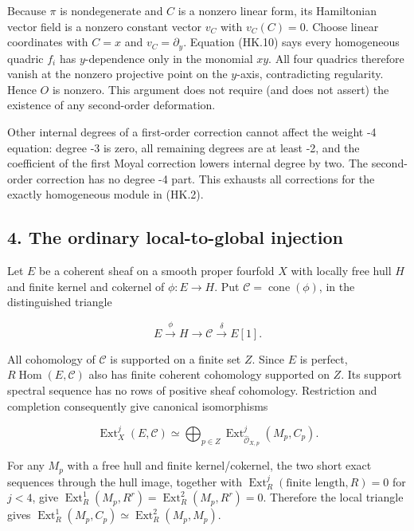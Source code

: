 Because \(\pi\) is nondegenerate and \(C\) is a nonzero linear form, its
Hamiltonian vector field is a nonzero constant vector \(v_C\) with
\(v_C(C)=0\). Choose linear coordinates with \(C=x\) and \(v_C=\partial_y\).
Equation (HK.10) says every homogeneous quadric \(f_i\) has \(y\)-dependence
only in the monomial \(xy\). All four quadrics therefore vanish at the
nonzero projective point on the \(y\)-axis, contradicting regularity.
Hence \(O\) is nonzero. This argument does not require (and does not
assert) the existence of any second-order deformation.

Other internal degrees of a first-order correction cannot affect
the weight -4 equation: degree -3 is zero, all remaining degrees
are at least -2, and the coefficient of the first Moyal correction
lowers internal degree by two. The second-order correction has no
degree -4 part. This exhausts all corrections for the exactly
homogeneous module in (HK.2).

\subsection{4. The ordinary local-to-global injection}\label{SF-E846:s4}

Let \(E\) be a coherent sheaf on a smooth proper fourfold \(X\) with locally
free hull \(H\) and finite kernel and cokernel of \(\phi:E\to H\). Put
\(\mathcal C=\operatorname{cone}(\phi)\), in the distinguished triangle

\[
 E\xrightarrow\phi H\longrightarrow\mathcal C
      \xrightarrow\delta E[1].
 \tag{HK.11}
\]

All cohomology of \(\mathcal C\) is supported on a finite set \(Z\). Since \(E\)
is perfect, \(R\operatorname{Hom}(E,\mathcal C)\) also has finite coherent cohomology
supported on \(Z\). Its support spectral sequence has no rows of
positive sheaf cohomology. Restriction and completion consequently
give canonical isomorphisms

\[
 \operatorname{Ext}^j_X(E,\mathcal C)
   \simeq\bigoplus_{p\in Z}
       \operatorname{Ext}^j_{\widehat{\mathcal O}_{X,p}}
            (M_p,C_p).
 \tag{HK.12}
\]

For any \(M_p\) with a free hull and finite kernel/cokernel, the two
short exact sequences through the hull image, together with
\(\operatorname{Ext}^j_R(\text{finite length},R)=0\) for \(j<4\), give
\(\operatorname{Ext}^1_R(M_p,R^r)=\operatorname{Ext}^2_R(M_p,R^r)=0\). Therefore the local triangle gives
\(\operatorname{Ext}^1_R(M_p,C_p)\simeq\operatorname{Ext}^2_R(M_p,M_p)\).

